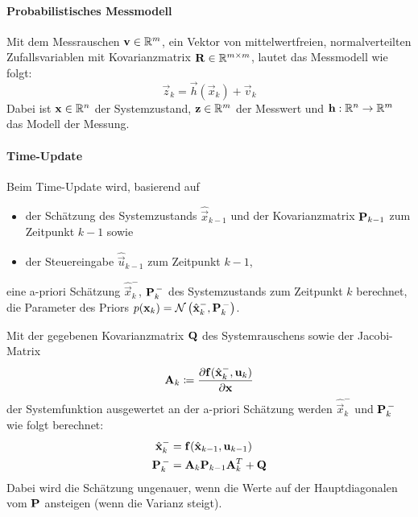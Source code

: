 				\paragraph{Probabilistisches Messmodell}
					Mit dem Messrauschen \( \boldsymbol{\mathrm{v}} \in \mathbb{R}^m \), ein Vektor von mittelwertfreien, normalverteilten Zufallsvariablen mit Kovarianzmatrix \( \boldsymbol{\mathrm{R}} \in \mathbb{R}^{m \times m} \), lautet das Messmodell wie folgt:
					\begin{equation*}
						\vec{z}_k = \vec{h}(\vec{x}_k) + \vec{v}_k
					\end{equation*}
					Dabei ist \( \boldsymbol{\mathrm{x}} \in \mathbb{R}^n \) der Systemzustand, \( \boldsymbol{\mathrm{z}} \in \mathbb{R}^m \) der Messwert und \( \boldsymbol{\mathrm{h}} : \mathbb{R}^n \to \mathbb{R}^m \) das Modell der Messung.

				\paragraph{Time-Update}
					Beim Time-Update wird, basierend auf
					\begin{itemize}
						\item der Schätzung des Systemzustands \( \hat{\vec{x}}_{k - 1} \) und der Kovarianzmatrix \( \boldsymbol{\mathrm{P}}_{k - 1} \) zum Zeitpunkt \( k - 1 \) sowie
						\item der Steuereingabe \( \hat{\vec{u}}_{k - 1} \) zum Zeitpunkt \( k - 1 \),
					\end{itemize}
					eine a-priori Schätzung \( \hat{\vec{x}}_k^- \), \( \boldsymbol{\mathrm{P}}_k^{\,-} \) des Systemzustands zum Zeitpunkt \(k\) berechnet, \dh die Parameter des Priors \( p(\boldsymbol{\mathrm{x}}_k) = \mathcal{N}\,\big(\hat{\boldsymbol{\mathrm{x}}}_k^-, \boldsymbol{\mathrm{P}}_k^{\,-}\big) \).
					
					Mit der gegebenen Kovarianzmatrix \( \boldsymbol{\mathrm{Q}} \) des Systemrauschens sowie der Jacobi-Matrix
					\begin{equation*}
						\boldsymbol{\mathrm{A}}_k \coloneqq \frac{\partial \boldsymbol{\mathrm{f}}(\hat{\boldsymbol{\mathrm{x}}}_k^-, \boldsymbol{\mathrm{u}}_k)}{\partial \boldsymbol{\mathrm{x}}}
					\end{equation*}
					der Systemfunktion ausgewertet an der a-priori Schätzung werden \( \hat{\vec{x}}_k^- \) und \( \boldsymbol{\mathrm{P}}_k^{\,-} \) wie folgt berechnet:
					\begin{align*}
						\hat{\boldsymbol{\mathrm{x}}}_k^- & = \boldsymbol{\mathrm{f}}(\hat{\boldsymbol{\mathrm{x}}}_{k - 1}, \boldsymbol{\mathrm{u}}_{k - 1}) \\
						\boldsymbol{\mathrm{P}}_k^{\,-}       & = \boldsymbol{\mathrm{A}}_k \boldsymbol{\mathrm{P}}_{k - 1} \boldsymbol{\mathrm{A}}_k^T + \boldsymbol{\mathrm{Q}}
					\end{align*}
					Dabei wird die Schätzung ungenauer, wenn die Werte auf der Hauptdiagonalen vom \( \boldsymbol{\mathrm{P}} \) ansteigen (\dh wenn die Varianz steigt).


